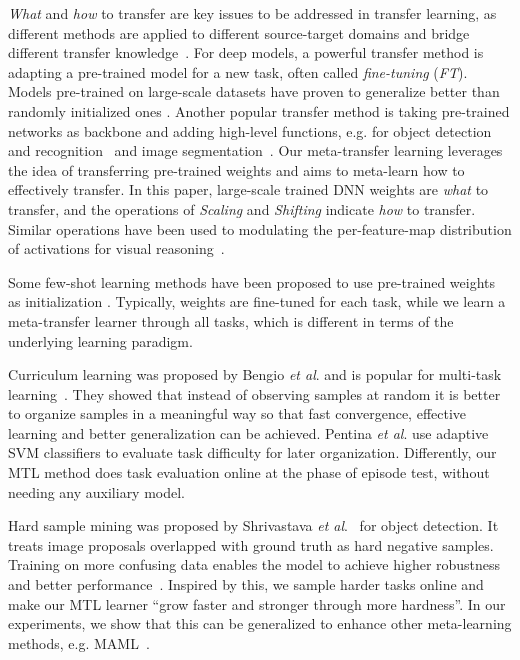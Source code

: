 \emph{What} and \emph{how} to transfer are key issues to be addressed in transfer learning, as different methods are applied to different source-target domains and bridge different transfer knowledge~\cite{PanTKY11, YangICDM07, WeiICML2018, AmirCVPR18}.
%
For deep models, a powerful transfer method is adapting a pre-trained model for a new task, often called \emph{fine-tuning} (\emph{FT}). Models pre-trained on large-scale datasets have proven to generalize better than randomly initialized ones \cite{Erhan10}.
%
Another popular transfer method is taking pre-trained networks as backbone and adding high-level functions, e.g. for object detection and recognition~\cite{HuangCVPR017, Sun_2017_CVPR, Sun_2018_CVPR} and image segmentation~\cite{He_MaskRCNN17,ChenPAMI18}.
%
Our meta-transfer learning leverages the idea of transferring
pre-trained weights and aims to meta-learn how to effectively transfer. 
%
In this paper, large-scale trained DNN weights are \emph{what} to transfer, and the operations of \emph{Scaling} and \emph{Shifting} indicate \emph{how} to transfer.
Similar operations have been used to modulating the per-feature-map distribution of activations for visual reasoning~\cite{FiLM2018}.

Some few-shot learning methods have been proposed to use pre-trained weights as initialization \cite{Keshari18, MishraICLR2018, QiaoCVPR2018, ScottNIPS2018, Rusu2019}. Typically, weights are fine-tuned for each task, while we learn a meta-transfer learner through all tasks, which is different in terms of the underlying learning paradigm. 
%

Curriculum learning was proposed by Bengio \emph{et al}. \cite{BengioLCW09} and is popular for multi-task learning~\cite{PentinaCVPR15, SarafianosGNK17, WeinshallCA18, GravesICML2017}.
They showed that instead of observing samples at random it is better to organize samples in a meaningful way so that fast convergence, effective learning and better generalization can be achieved.
Pentina \emph{et al}. \cite{PentinaCVPR15} use adaptive SVM classifiers to evaluate task difficulty for later organization. Differently, our MTL method does task evaluation online at the phase of episode test, without needing any auxiliary model.

Hard sample mining was proposed by Shrivastava \emph{et al}.~\cite{ShrivastavaGG16} for object detection. It treats image proposals overlapped with ground truth as hard negative samples. Training on more confusing data enables the model to achieve higher robustness and better performance~\cite{CanevetF16, HarwoodGCRD17, DalalT05}. 
Inspired by this, we sample harder tasks online and make our MTL learner ``grow faster and stronger through more hardness''. In our experiments, we show that this can be generalized to enhance other meta-learning methods, e.g. MAML~\cite{FinnAL17}.
%
%

